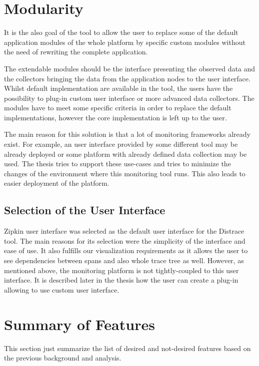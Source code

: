 \section{Modularity}
It is the also goal of the tool to allow the user to replace some of the default application modules of the whole platform by specific custom modules without the need of rewriting the complete application.

The extendable modules should be the interface presenting the observed data and the collectors bringing the data from the application nodes to the user interface. Whilst default implementation are available in the tool, the users have the possibility to plug-in custom user interface or more advanced data collectors. The modules have to meet some specific criteria in order to replace the default implementations, however the core implementation is left up to the user. 

The main reason for this solution is that a lot of monitoring frameworks already exist. For example, an user interface provided by some different tool may be already deployed or some platform with already defined data collection may be used. The thesis tries to support these use-cases and tries to minimize the changes of the environment where this monitoring tool runs. This also leads to easier deployment of the platform. 

\subsection{Selection of the User Interface}
Zipkin user interface was selected as the default user interface for the Distrace tool. The main reasons for its selection were the simplicity of the interface and ease of use. It also fulfills our visualization requirements as it allows the user to see dependencies between spans and also whole trace tree as well. However, as mentioned above, the monitoring platform is not tightly-coupled to this user interface. It is described later in the thesis how the user can create a plug-in allowing to use custom user interface.

\section{Summary of Features}
This section just summarize the list of desired and not-desired features based on the previous background and analysis.

